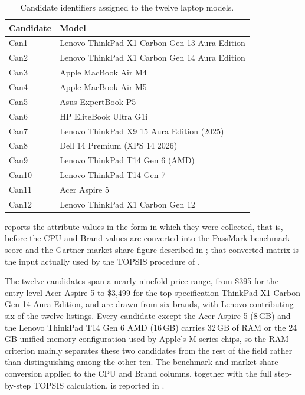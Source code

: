 \begin{table}[htbp]
  \centering
  \caption{Candidate identifiers assigned to the twelve laptop models.}
  \label{tab:candidate-ids}
  \begin{tabular}{@{}ll@{}}
    \toprule
    Candidate & Model \\
    \midrule
    Can1  & Lenovo ThinkPad X1 Carbon Gen 13 Aura Edition \\
    Can2  & Lenovo ThinkPad X1 Carbon Gen 14 Aura Edition \\
    Can3  & Apple MacBook Air M4 \\
    Can4  & Apple MacBook Air M5 \\
    Can5  & Asus ExpertBook P5 \\
    Can6  & HP EliteBook Ultra G1i \\
    Can7  & Lenovo ThinkPad X9 15 Aura Edition (2025) \\
    Can8  & Dell 14 Premium (XPS 14 2026) \\
    Can9  & Lenovo ThinkPad T14 Gen 6 (AMD) \\
    Can10 & Lenovo ThinkPad T14 Gen 7 \\
    Can11 & Acer Aspire 5 \\
    Can12 & Lenovo ThinkPad X1 Carbon Gen 12 \\
    \bottomrule
  \end{tabular}
\end{table}

 reports the attribute values in the form in which they were
collected, that is, before the CPU and Brand values are converted into the PassMark
benchmark score and the Gartner market-share figure described in
; that converted matrix is the input actually used by the
TOPSIS procedure of .



The twelve candidates span a nearly ninefold price range, from \$395 for the
entry-level Acer Aspire 5 to \$3{,}499 for the top-specification ThinkPad X1 Carbon Gen 14
Aura Edition, and are drawn from six brands, with Lenovo contributing six of the twelve
listings. Every candidate except the Acer Aspire 5 (8\,GB) and the Lenovo ThinkPad T14
Gen 6 AMD (16\,GB) carries 32\,GB of RAM or the 24\,GB unified-memory configuration used
by Apple's M-series chips, so the RAM criterion mainly separates these two candidates from
the rest of the field rather than distinguishing among the other ten. The benchmark and
market-share conversion applied to the CPU and Brand columns, together with the full
step-by-step TOPSIS calculation, is reported in .


